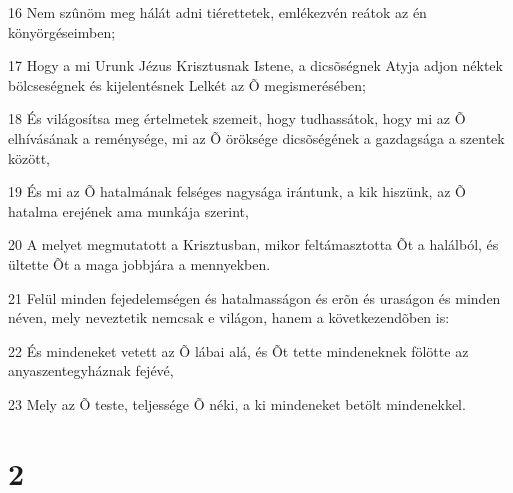 \par 16 Nem szûnöm meg hálát adni tiérettetek, emlékezvén reátok az én könyörgéseimben;
\par 17 Hogy a mi Urunk Jézus Krisztusnak Istene, a dicsõségnek Atyja adjon néktek bölcseségnek és kijelentésnek Lelkét az Õ megismerésében;
\par 18 És világosítsa meg értelmetek szemeit, hogy tudhassátok, hogy mi az Õ elhívásának a reménysége, mi az Õ öröksége dicsõségének a gazdagsága a szentek között,
\par 19 És mi az Õ hatalmának felséges nagysága irántunk, a kik hiszünk, az Õ hatalma erejének ama munkája szerint,
\par 20 A melyet megmutatott a Krisztusban, mikor feltámasztotta Õt a halálból, és ültette Õt a maga jobbjára a mennyekben.
\par 21 Felül minden fejedelemségen és hatalmasságon és erõn és uraságon és minden néven, mely neveztetik nemcsak e világon, hanem a következendõben is:
\par 22 És mindeneket vetett az Õ lábai alá, és Õt tette mindeneknek fölötte az anyaszentegyháznak fejévé,
\par 23 Mely az Õ teste, teljessége Õ néki, a ki mindeneket betölt mindenekkel.

\chapter{2}

